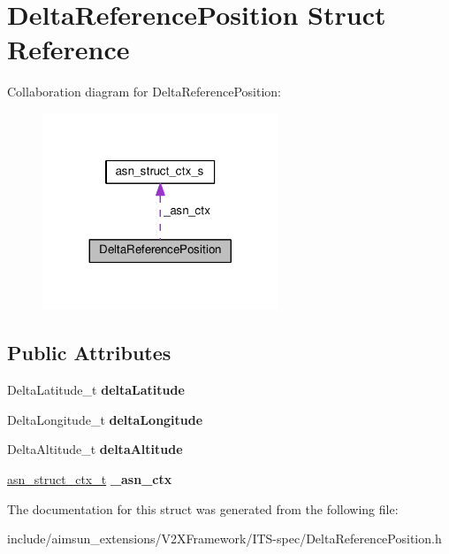 \hypertarget{structDeltaReferencePosition}{}\section{Delta\+Reference\+Position Struct Reference}
\label{structDeltaReferencePosition}


Collaboration diagram for Delta\+Reference\+Position\+:\nopagebreak
\begin{figure}[H]
\begin{center}
\leavevmode
\includegraphics[width=200pt]{structDeltaReferencePosition__coll__graph}
\end{center}
\end{figure}
\subsection*{Public Attributes}
\begin{DoxyCompactItemize}
\item 
Delta\+Latitude\+\_\+t {\bfseries delta\+Latitude}\hypertarget{structDeltaReferencePosition_a597c8177f928304a4c0511052ebaedc1}{}\label{structDeltaReferencePosition_a597c8177f928304a4c0511052ebaedc1}

\item 
Delta\+Longitude\+\_\+t {\bfseries delta\+Longitude}\hypertarget{structDeltaReferencePosition_ae222c3d2b9b67ce6fbca2e72f5c841f1}{}\label{structDeltaReferencePosition_ae222c3d2b9b67ce6fbca2e72f5c841f1}

\item 
Delta\+Altitude\+\_\+t {\bfseries delta\+Altitude}\hypertarget{structDeltaReferencePosition_a582e34c208d665f18366754210d4470d}{}\label{structDeltaReferencePosition_a582e34c208d665f18366754210d4470d}

\item 
\hyperlink{structasn__struct__ctx__s}{asn\+\_\+struct\+\_\+ctx\+\_\+t} {\bfseries \+\_\+asn\+\_\+ctx}\hypertarget{structDeltaReferencePosition_ac529e7c70c84b05fd840a7dd83b231f9}{}\label{structDeltaReferencePosition_ac529e7c70c84b05fd840a7dd83b231f9}

\end{DoxyCompactItemize}


The documentation for this struct was generated from the following file\+:\begin{DoxyCompactItemize}
\item 
include/aimsun\+\_\+extensions/\+V2\+X\+Framework/\+I\+T\+S-\/spec/Delta\+Reference\+Position.\+h\end{DoxyCompactItemize}
